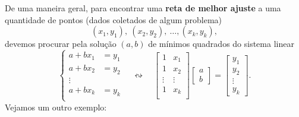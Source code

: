 De uma maneira geral, para encontrar uma \textbf{reta de melhor ajuste} a uma quantidade de pontos (dados coletados de algum problema)
\begin{equation}
(x_1, y_1), \ (x_2, y_2), \ \dots, (x_k, y_k),
\end{equation} devemos procurar pela solução $(a,b)$ de mínimos quadrados do sistema linear
\begin{equation}
\left\{
  \begin{array}{rl}
    a + b x_1 &\!\!\!\!\!= y_1  \\
    a + b x_2 &\!\!\!\!\!= y_2  \\
    \vdots &  \\
    a + b x_k &\!\!\!\!\!= y_k  \\
  \end{array}
\right. \quad \leftrightsquigarrow  \quad
\begin{bmatrix}
  1 & x_1 \\
  1 & x_2 \\
  \vdots & \vdots \\
  1 & x_k \\
\end{bmatrix}
\begin{bmatrix}
  a \\ b
\end{bmatrix} =
\begin{bmatrix}
  y_1 \\ y_2 \\ \vdots \\ y_k
\end{bmatrix}.
\end{equation} Vejamos um outro exemplo:

